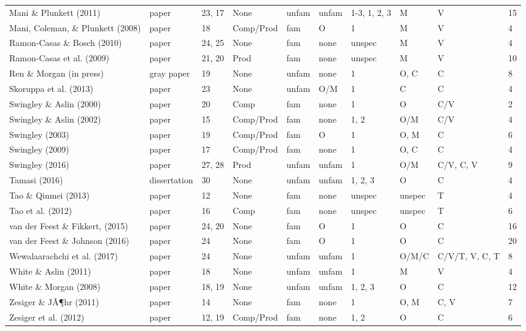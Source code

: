 \documentclass[
  man, noextraspace]{apa6}
\newenvironment{lltable}{\begin{landscape}\begin{center}\begin{ThreePartTable}}{\end{ThreePartTable}\end{center}\end{landscape}}
\begin{document}
\begin{lltable}
{\begin{longtable}{llllllllll}
Mani \& Plunkett (2011) & paper & 23, 17 & None & unfam & unfam & 1-3, 1, 2, 3 & M & V & 15\\
Mani, Coleman, \& Plunkett (2008) & paper & 18 & Comp/Prod & fam & O & 1 & M & V & 4\\
Ramon-Casas \& Bosch (2010) & paper & 24, 25 & None & fam & none & unspec & M & V & 4\\
Ramon-Casas et al. (2009) & paper & 21, 20 & Prod & fam & none & unspec & M & V & 10\\
Ren \& Morgan (in press) & gray paper & 19 & None & unfam & none & 1 & O, C & C & 8\\
Skoruppa et al. (2013) & paper & 23 & None & unfam & O/M & 1 & C & C & 4\\
Swingley \& Aslin (2000) & paper & 20 & Comp & fam & none & 1 & O & C/V & 2\\
Swingley \& Aslin (2002) & paper & 15 & Comp/Prod & fam & none & 1, 2 & O/M & C/V & 4\\
Swingley (2003) & paper & 19 & Comp/Prod & fam & O & 1 & O, M & C & 6\\
Swingley (2009) & paper & 17 & Comp/Prod & fam & none & 1 & O, C & C & 4\\
Swingley (2016) & paper & 27, 28 & Prod & unfam & unfam & 1 & O/M & C/V, C, V & 9\\
Tamasi (2016) & dissertation & 30 & None & unfam & unfam & 1, 2, 3 & O & C & 4\\
Tao \& Qinmei (2013) & paper & 12 & None & fam & none & unspec & unspec & T & 4\\
Tao et al. (2012) & paper & 16 & Comp & fam & none & unspec & unspec & T & 6\\
van der Feest \& Fikkert, (2015) & paper & 24, 20 & None & fam & O & 1 & O & C & 16\\
van der Feest \& Johnson (2016) & paper & 24 & None & fam & O & 1 & O & C & 20\\
Wewalaarachchi et al. (2017) & paper & 24 & None & unfam & unfam & 1 & O/M/C & C/V/T, V, C, T & 8\\
White \& Aslin (2011) & paper & 18 & None & unfam & unfam & 1 & M & V & 4\\
White \& Morgan (2008) & paper & 18, 19 & None & unfam & unfam & 1, 2, 3 & O & C & 12\\
Zesiger \& JÃ¶hr (2011) & paper & 14 & None & fam & none & 1 & O, M & C, V & 7\\
Zesiger et al. (2012) & paper & 12, 19 & Comp/Prod & fam & none & 1, 2 & O & C & 6\\
\bottomrule
\end{longtable}
}
\end{lltable}
\end{document}
